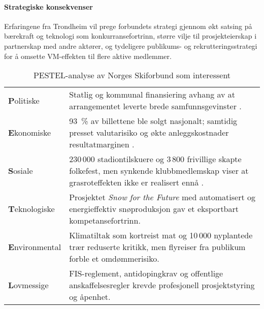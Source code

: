 \paragraph{Strategiske konsekvenser}
Erfaringene fra Trondheim vil prege forbundets strategi gjennom økt satsing på bærekraft og teknologi som konkurransefortrinn, større vilje til prosjekteierskap i partnerskap med andre aktører, og tydeligere publikums- og rekrutteringsstrategi for å omsette VM-effekten til flere aktive medlemmer.
\begin{table}[H]
    \centering
    \begin{tabular}{@{}p{2.7cm}p{10.2cm}@{}}
        \toprule                                                                                                                                                                                            \\ \midrule
        \textbf{P}olitiske     & Statlig og kommunal finansiering avhang av at arrangementet leverte brede samfunnsgevinster \parencite{TrondheimKommuneVM}.                                                     \\
        \textbf{E}konomiske    & 93~\% av billettene ble solgt nasjonalt; samtidig presset valutarisiko og økte anleggskostnader resultatmarginen \parencite{AdressaKjopefest}.                                  \\
        \textbf{S}osiale       & 230\,000 stadiontilskuere og 3\,800 frivillige skapte folkefest, men synkende klubbmedlemskap viser at grasroteffekten ikke er realisert ennå \parencite{Adresseavisen,OsloVM}. \\
        \textbf{T}eknologiske  & Prosjektet \textit{Snow for the Future} med automatisert og energieffektiv snøproduksjon gav et eksportbart kompetansefortrinn\parencite{Trondheim2025Sustainability}.          \\
        \textbf{E}nvironmental & Klimatiltak som kortreist mat og 10\,000 nyplantede trær reduserte kritikk, men flyreiser fra publikum forble et omdømmerisiko.                                            \\
        \textbf{L}ovmessige    & FIS-reglement, antidopingkrav og offentlige anskaffelsesregler krevde profesjonell prosjektstyring og åpenhet.                                                             \\ \bottomrule
    \end{tabular}
    \caption{PESTEL-analyse av Norges Skiforbund som interessent}
    \label{tab:skiforbundet}
\end{table}

